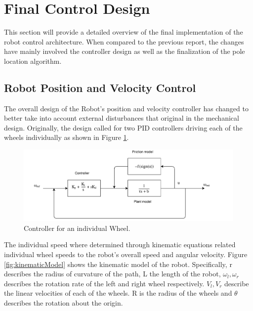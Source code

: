 \documentclass[ece]{uw-wkrpt}
\let\oldsection\section
\renewcommand\section{\clearpage\oldsection}
\begin{document}
\section{Final Control Design} \label{controls}

This section will provide a detailed overview of the final implementation of the robot control architecture. When compared to the previous report, the changes have mainly involved the controller design as well as the finalization of the pole location algorithm.

\subsection{Robot Position and Velocity Control}
The overall design of the Robot's position and velocity controller has changed to better take into account external disturbances that original in the mechanical design. Originally, the design called for two PID controllers driving each of the wheels individually as shown in Figure \ref{fig:singleWheelController}. 

\begin{figure}
    \centering
    \includegraphics[width=5.5in]{res/380ModelForWheel}
    \caption[Controller for an individual Wheel]
          {Controller for an individual Wheel.}
    \label{fig:singleWheelController}
\end{figure}

The individual speed where determined through kinematic equations related individual wheel speeds to the robot's overall speed and angular velocity. Figure \ref{fig:kinematicModel} shows the kinematic model of the robot. Specifically, r describes the radius of curvature of the path, L the length of the robot, $\omega_l, \omega_r$ describes the rotation rate of the left and right wheel respectively. $V_l, V_r$ describe the linear velocities of each of the wheels. R is the radius of the wheels and $\theta$ describes the rotation about the origin. 
\end{document}

